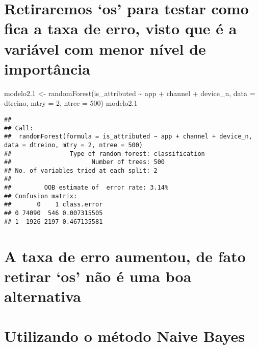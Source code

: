 \documentclass[
]{article}
\newenvironment{Shaded}{\begin{snugshade}}{\end{snugshade}}
\newcommand{\AttributeTok}[1]{\textcolor[rgb]{0.77,0.63,0.00}{#1}}
\newcommand{\DecValTok}[1]{\textcolor[rgb]{0.00,0.00,0.81}{#1}}
\newcommand{\FloatTok}[1]{\textcolor[rgb]{0.00,0.00,0.81}{#1}}
\newcommand{\FunctionTok}[1]{\textcolor[rgb]{0.00,0.00,0.00}{#1}}
\newcommand{\NormalTok}[1]{#1}
\newcommand{\OtherTok}[1]{\textcolor[rgb]{0.56,0.35,0.01}{#1}}
\newcommand{\SpecialCharTok}[1]{\textcolor[rgb]{0.00,0.00,0.00}{#1}}
\begin{document}
\hypertarget{retiraremos-os-para-testar-como-fica-a-taxa-de-erro-visto-que-uxe9-a-variuxe1vel-com-menor-nuxedvel-de-importuxe2ncia}{%
\section{Retiraremos `os' para testar como fica a taxa de erro, visto
que é a variável com menor nível de
importância}\label{retiraremos-os-para-testar-como-fica-a-taxa-de-erro-visto-que-uxe9-a-variuxe1vel-com-menor-nuxedvel-de-importuxe2ncia}}

\begin{Shaded}
\begin{Highlighting}[]
\NormalTok{modelo2}\FloatTok{.1} \OtherTok{\textless{}{-}} \FunctionTok{randomForest}\NormalTok{(is\_attributed }\SpecialCharTok{\textasciitilde{}}\NormalTok{ app  }\SpecialCharTok{+}\NormalTok{ channel }\SpecialCharTok{+}\NormalTok{ device\_n,}
                        \AttributeTok{data =}\NormalTok{ dtreino,}
                        \AttributeTok{mtry =} \DecValTok{2}\NormalTok{,}
                        \AttributeTok{ntree =} \DecValTok{500}\NormalTok{)}
\NormalTok{modelo2}\FloatTok{.1}
\end{Highlighting}
\end{Shaded}

\begin{verbatim}
## 
## Call:
##  randomForest(formula = is_attributed ~ app + channel + device_n,      data = dtreino, mtry = 2, ntree = 500) 
##                Type of random forest: classification
##                      Number of trees: 500
## No. of variables tried at each split: 2
## 
##         OOB estimate of  error rate: 3.14%
## Confusion matrix:
##       0    1 class.error
## 0 74090  546 0.007315505
## 1  1926 2197 0.467135581
\end{verbatim}

\hypertarget{a-taxa-de-erro-aumentou-de-fato-retirar-os-nuxe3o-uxe9-uma-boa-alternativa}{%
\section{A taxa de erro aumentou, de fato retirar `os' não é uma boa
alternativa}\label{a-taxa-de-erro-aumentou-de-fato-retirar-os-nuxe3o-uxe9-uma-boa-alternativa}}

\hypertarget{utilizando-o-muxe9todo-naive-bayes}{%
\section{Utilizando o método Naive
Bayes}\label{utilizando-o-muxe9todo-naive-bayes}}
\end{document}

